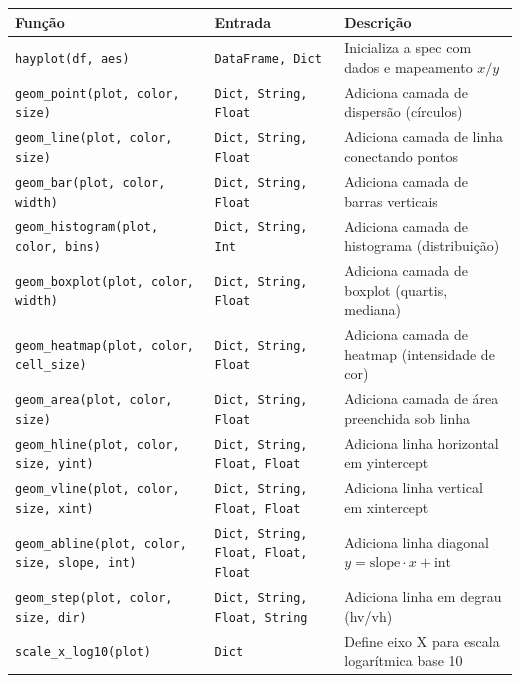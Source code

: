 \documentclass[12pt, a4paper, oneside]{book}
\newcommand{\code}[1]{\texttt{#1}}
\begin{document}
\begin{center}
  \begin{tabularx}{\textwidth}{@{}L{4.8cm}L{4.0cm}X@{}}
    \toprule
    \textbf{Função} & \textbf{Entrada} & \textbf{Descrição} \\
    \midrule
    \code{hayplot(df, aes)}                        & \code{DataFrame, Dict}              & Inicializa a spec com dados e mapeamento $x/y$ \\[3pt]
    \code{geom\_point(plot, color, size)}          & \code{Dict, String, Float}          & Adiciona camada de dispersão (círculos) \\[3pt]
    \code{geom\_line(plot, color, size)}           & \code{Dict, String, Float}          & Adiciona camada de linha conectando pontos \\[3pt]
    \code{geom\_bar(plot, color, width)}           & \code{Dict, String, Float}          & Adiciona camada de barras verticais \\[3pt]
    \code{geom\_histogram(plot, color, bins)}     & \code{Dict, String, Int}            & Adiciona camada de histograma (distribuição) \\[3pt]
    \code{geom\_boxplot(plot, color, width)}       & \code{Dict, String, Float}          & Adiciona camada de boxplot (quartis, mediana) \\[3pt]
    \code{geom\_heatmap(plot, color, cell\_size)}  & \code{Dict, String, Float}          & Adiciona camada de heatmap (intensidade de cor) \\[3pt]
    \code{geom\_area(plot, color, size)}           & \code{Dict, String, Float}          & Adiciona camada de área preenchida sob linha \\[3pt]
    \code{geom\_hline(plot, color, size, yint)}    & \code{Dict, String, Float, Float}  & Adiciona linha horizontal em yintercept \\[3pt]
    \code{geom\_vline(plot, color, size, xint)}    & \code{Dict, String, Float, Float}  & Adiciona linha vertical em xintercept \\[3pt]
    \code{geom\_abline(plot, color, size, slope, int)} & \code{Dict, String, Float, Float, Float} & Adiciona linha diagonal $y = \text{slope} \cdot x + \text{int}$ \\[3pt]
    \code{geom\_step(plot, color, size, dir)}     & \code{Dict, String, Float, String} & Adiciona linha em degrau (hv/vh) \\[3pt]
    \code{scale\_x\_log10(plot)}                   & \code{Dict}                         & Define eixo X para escala logarítmica base 10 \\[3pt]

\end{tabularx}
\end{center}
\end{document}
